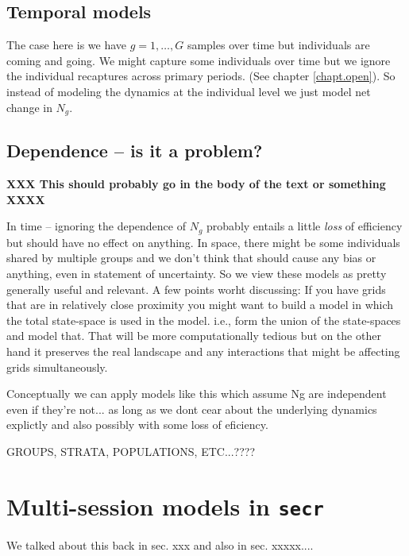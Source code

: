 \subsection{Temporal models }

The case here is we have $g=1,\ldots,G$ samples over time but
individuals are coming and going.
We might capture some individuals over time but we ignore the
individual recaptures across primary periods. (See chapter
\ref{chapt.open}). So instead of modeling the dynamics at the individual
level we just model net change in $N_{g}$.


\subsection{Dependence -- is it a problem?}

{\bf XXX This should probably go in the body of the text or something XXXX}

In time -- ignoring the dependence of $N_{g}$ probably entails a
little {\it loss} of efficiency but should have no effect on anything.
In space, there might be some individuals shared by multiple groups
and we don't think that should cause any bias or anything, even in
statement of uncertainty. So we view these models as pretty generally
useful and relevant.
A few points worht discussing: If you have grids that are in
relatively close proximity you might want to build a model in which
the total state-space is used in the model. i.e., form the union of
the state-spaces and model that. That will be more computationally
tedious but on the other hand it preserves the real landscape and any
interactions that might be affecting grids simultaneously. 


Conceptually we can apply models like this which assume Ng are
independent even if they're not... as long as we dont cear about the
underlying dynamics explictly and also possibly with some loss of
eficiency. 

GROUPS, STRATA, POPULATIONS, ETC...????

\section{Multi-session models in \mbox{\tt secr}  }

We talked about this back in sec. xxx and also in sec. xxxxx....

